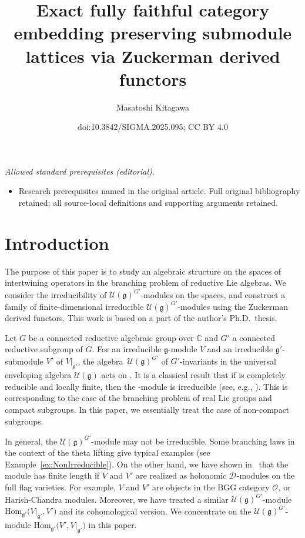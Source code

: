 \documentclass[10pt,a4paper]{amsart}
\title{Exact fully faithful category embedding preserving submodule lattices via Zuckerman derived functors}
\author{Masatoshi Kitagawa}
\date{doi:10.3842/SIGMA.2025.095; CC BY 4.0}
\numberwithin{equation}{section}
\theoremstyle{definition}
\newcommand{\Hom}{\mathrm{Hom}}
\newcommand{\BasicRing}[1]{\mathbb{#1}}
\newcommand{\CC}{\BasicRing{C}}
\newcommand{\lieC}[1]{\mathfrak{#1}}
\newcommand{\lie}[1]{\mathfrak{#1}}
\newcommand{\univ}[1]{\mathcal{U}(\lieC{#1})}
\newcommand{\BGGcat}[2]{\mathcal{O}_{\lie{#2}}^{\lie{#1}}}
\newcommand{\Dsheaf}[2]{\mathscr{#1}_{#2}}
\newcommand{\ntDsheaf}[1]{\Dsheaf{D}{#1}}
\begin{document}
\maketitle
\noindent\textit{Allowed standard prerequisites (editorial).}\begin{itemize}
\item Research prerequisites named in the original article. Full original bibliography retained; all source-local definitions and supporting arguments retained.
\end{itemize}\medskip
\section{Introduction}

The purpose of this paper is to study an algebraic structure on the spaces of intertwining operators in the branching problem of reductive Lie algebras.
We consider the irreducibility of $\univ{g}^{G'}$-modules on the spaces, and construct a family of finite-dimensional irreducible $\univ{g}^{G'}$-modules using the Zuckerman derived functors.
This work is based on a part of the author's Ph.D.\ thesis.

Let $G$ be a connected reductive algebraic group over $\CC$ and $G'$ a connected reductive subgroup of $G$.
For an irreducible $\lie{g}$-module $V$ and an irreducible $\lie{g'}$-submodule $V'$ of $V|_{\lie{g'}}$, the algebra~$\univ{g}^{G'}$ of $G'$-invariants in the universal enveloping algebra $\univ{g}$ acts on \smash{$\Hom_{\lie{g'}}\bigl(V', V|_{\lie{g'}}\bigr)$}.
It is a classical result that if \smash{$V|_{\lie{g'}}$} is completely reducible and locally finite, then the \smash{$\univ{g}^{G'}$}-module is irreducible (see, e.g., \cite[\S4.2]{GoWa09}).
This is corresponding to the case of the branching problem of real Lie groups and compact subgroups.
In this paper, we essentially treat the case of non-compact subgroups.

In general, the $\univ{g}^{G'}$-module may not be irreducible.
Some branching laws in the context of the theta lifting give typical examples (see Example~\ref{ex:NonIrreducible}).
On the other hand, we have shown in~\cite[Theorem~7.18 and its corollaries]{Ki20-2} that the module has finite length if $V$ and $V'$ are realized as holonomic $\ntDsheaf{}$-modules on the full flag varieties.
For example, $V$ and $V'$ are objects in the BGG category $\BGGcat{}{}$, or Harish-Chandra modules.
Moreover, we have treated a similar $\univ{g}^{G'}$-module $\Hom_{\lie{g'}}\bigl(V|_{\lie{g'}}, V'\bigr)$ and its cohomological version.
We concentrate on the $\univ{g}^{G'}$-module $\Hom_{\lie{g'}}\bigl(V', V|_{\lie{g'}}\bigr)$ in this paper.
\end{document}
